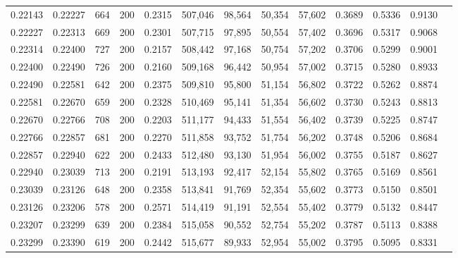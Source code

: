 \begin{tabular}{rrrrrrrrrrrrr}
0.22143 & 0.22227 &    664 & 200 &                                     0.2315 & 507,046 &  98,564 &  50,354 &  57,602 & 0.3689 & 0.5336 & 0.9130 \\
0.22227 & 0.22313 &    669 & 200 &                                     0.2301 & 507,715 &  97,895 &  50,554 &  57,402 & 0.3696 & 0.5317 & 0.9068 \\
0.22314 & 0.22400 &    727 & 200 &                                     0.2157 & 508,442 &  97,168 &  50,754 &  57,202 & 0.3706 & 0.5299 & 0.9001 \\
0.22400 & 0.22490 &    726 & 200 &                                     0.2160 & 509,168 &  96,442 &  50,954 &  57,002 & 0.3715 & 0.5280 & 0.8933 \\
0.22490 & 0.22581 &    642 & 200 &                                     0.2375 & 509,810 &  95,800 &  51,154 &  56,802 & 0.3722 & 0.5262 & 0.8874 \\
0.22581 & 0.22670 &    659 & 200 &                                     0.2328 & 510,469 &  95,141 &  51,354 &  56,602 & 0.3730 & 0.5243 & 0.8813 \\
0.22670 & 0.22766 &    708 & 200 &                                     0.2203 & 511,177 &  94,433 &  51,554 &  56,402 & 0.3739 & 0.5225 & 0.8747 \\
0.22766 & 0.22857 &    681 & 200 &                                     0.2270 & 511,858 &  93,752 &  51,754 &  56,202 & 0.3748 & 0.5206 & 0.8684 \\
0.22857 & 0.22940 &    622 & 200 &                                     0.2433 & 512,480 &  93,130 &  51,954 &  56,002 & 0.3755 & 0.5187 & 0.8627 \\
0.22940 & 0.23039 &    713 & 200 &                                     0.2191 & 513,193 &  92,417 &  52,154 &  55,802 & 0.3765 & 0.5169 & 0.8561 \\
0.23039 & 0.23126 &    648 & 200 &                                     0.2358 & 513,841 &  91,769 &  52,354 &  55,602 & 0.3773 & 0.5150 & 0.8501 \\
0.23126 & 0.23206 &    578 & 200 &                                     0.2571 & 514,419 &  91,191 &  52,554 &  55,402 & 0.3779 & 0.5132 & 0.8447 \\
0.23207 & 0.23299 &    639 & 200 &                                     0.2384 & 515,058 &  90,552 &  52,754 &  55,202 & 0.3787 & 0.5113 & 0.8388 \\
0.23299 & 0.23390 &    619 & 200 &                                     0.2442 & 515,677 &  89,933 &  52,954 &  55,002 & 0.3795 & 0.5095 & 0.8331 \\

\end{tabular}
